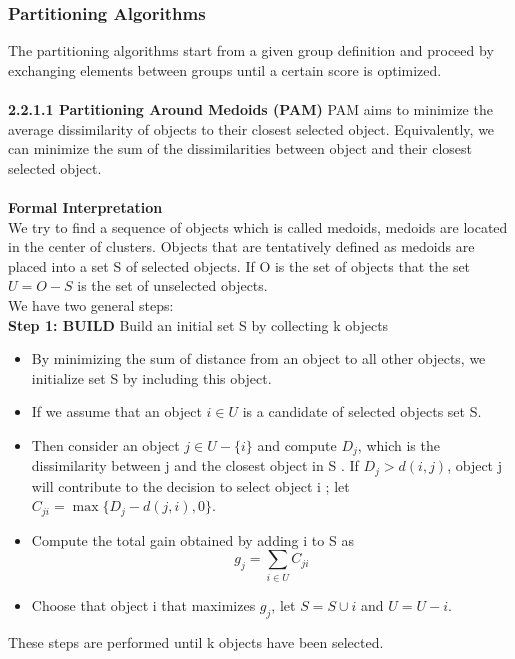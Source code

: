\documentclass[a4paper,12pt,fleqn]{article}
\begin{document}
\subsubsection{Partitioning Algorithms}%
The partitioning algorithms start from a given group definition and proceed by exchanging elements between groups until a certain score is optimized.\\\\
\textbf{2.2.1.1 Partitioning Around Medoids (PAM)}
PAM aims to minimize the average dissimilarity of objects to their closest selected object. Equivalently, we can minimize the sum of the dissimilarities between object and their closest selected object.\\
\\
\textbf{Formal Interpretation}\\
We try to find a sequence of objects which is called medoids, medoids are located in the center of clusters. Objects that are tentatively defined as medoids are placed into a set S of selected objects. If O is the set of objects that the set $U = O - S$ is the set of unselected objects. \\
We have two general steps:\\
\textbf{Step 1: BUILD}   Build an initial set S by collecting k objects\\
\begin{itemize}
\item By minimizing the sum of distance from an object to all other objects, we initialize set S by including this object.\\
\item If we assume that an object $i \in U$ is a candidate of selected objects set S. \\
\item Then consider an object $j \in U - \{i\}$ and compute $ D_j $, which is the dissimilarity between j  and the closest object in S . If $D_j >d(i,j)$, object j will contribute to the decision to select object i ; let $C_{ji}=\max\{ D_j - d(j,i), 0\}$.\\
\item Compute the total gain obtained by adding i to S as \begin{equation*}g_j=\sum_{i \in U}C_{ji} \end{equation*} 
\item Choose that object i that maximizes $g_j$, let $S= S \cup {i}$ and $U=U - {i}$.
\end{itemize}
These steps are performed until k objects have been selected. \\
\end{document}
